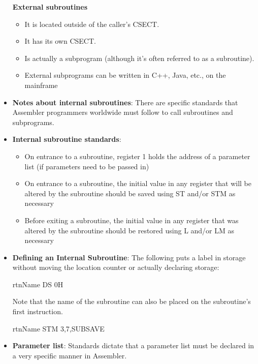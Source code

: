 \documentclass{report}
\begin{document}
\begin{itemize}
            \bigbreak \noindent 
            \textbf{External subroutines}
            \begin{itemize}
                \item It is located outside of the caller's CSECT.
                \item It has its own CSECT.
                \item Is actually a subprogram (although it's often referred to as a subroutine).
                \item External subprograms can be written in C++, Java, etc., on the mainframe
            \end{itemize}
        \item \textbf{Notes about internal subroutines}: There are specific standards that Assembler programmers worldwide must follow to call subroutines and subprograms.
        \item \textbf{Internal subroutine standards}:
            \begin{itemize}
                \item On entrance to a subroutine, register 1 holds the address of a parameter list (if parameters need to be passed in)
                \item On entrance to a subroutine, the initial value in any register that will be altered by the subroutine should be saved using ST and/or STM as necessary
                \item Before exiting a subroutine, the initial value in any register that was altered by the subroutine should be restored using L and/or LM as necessary
            \end{itemize}
        \item \textbf{Defining an Internal Subroutine}: The following puts a label in storage without moving the location counter or actually declaring storage:
            \bigbreak \noindent 
            \begin{cppcode}
            rtnName DS 0H
            \end{cppcode}
            Note that the name of the subroutine can also be placed on the subroutine's first instruction.
            \bigbreak \noindent 
            \begin{cppcode}
            rtnName STM 3,7,SUBSAVE
            \end{cppcode}
        \item \textbf{Parameter list}: Standards dictate that a parameter list must be declared in a very specific manner in Assembler.
            \bigbreak \noindent 

\end{itemize}
\end{document}
